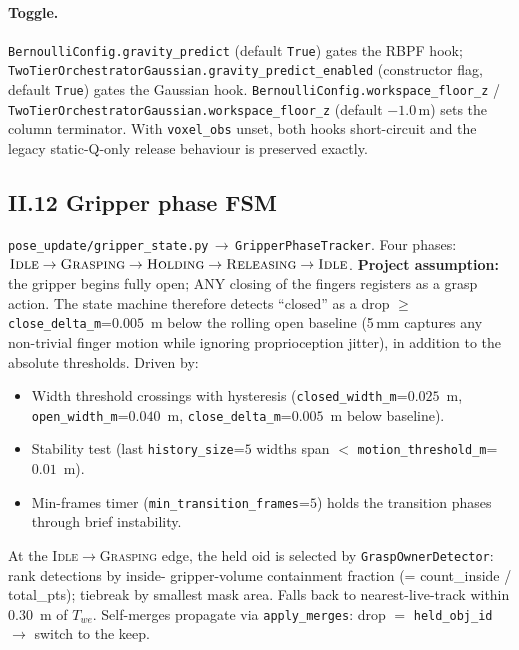 \documentclass[11pt]{article}
\newcommand{\file}[1]{\texttt{#1}}
\begin{document}
\paragraph{Toggle.}
\texttt{BernoulliConfig.gravity\_predict} (default \texttt{True})
gates the RBPF hook;
\texttt{TwoTierOrchestratorGaussian.gravity\_predict\_enabled}
(constructor flag, default \texttt{True}) gates the Gaussian hook.
\texttt{BernoulliConfig.workspace\_floor\_z} /
\texttt{TwoTierOrchestratorGaussian.workspace\_floor\_z} (default
$-1.0$\,m) sets the column terminator. With \texttt{voxel\_obs}
unset, both hooks short-circuit and the legacy static-Q-only release
behaviour is preserved exactly.

\subsection*{II.12 Gripper phase FSM}

\file{pose\_update/gripper\_state.py}\,$\to$\,\texttt{GripperPhaseTracker}.
Four phases:
$\textsc{Idle}\to\textsc{Grasping}\to\textsc{Holding}\to\textsc{Releasing}\to\textsc{Idle}$.
\textbf{Project assumption:} the gripper begins fully open; ANY closing
of the fingers registers as a grasp action. The state machine therefore
detects ``closed'' as a drop $\ge $ \texttt{close\_delta\_m}=$0.005$~m
below the rolling open baseline (5\,mm captures any non-trivial finger
motion while ignoring proprioception jitter), in addition to the
absolute thresholds. Driven by:
\begin{itemize}
\item Width threshold crossings with hysteresis
  (\texttt{closed\_width\_m}=$0.025$~m, \texttt{open\_width\_m}=$0.040$~m,
  \texttt{close\_delta\_m}=$0.005$~m below baseline).
\item Stability test (last \texttt{history\_size}=$5$ widths span
  $<$ \texttt{motion\_threshold\_m}=$0.01$~m).
\item Min-frames timer (\texttt{min\_transition\_frames}=$5$) holds the
  transition phases through brief instability.
\end{itemize}
At the \textsc{Idle}$\to$\textsc{Grasping} edge, the held oid is
selected by \texttt{GraspOwnerDetector}: rank detections by inside-
gripper-volume containment fraction (= count\_inside / total\_pts);
tiebreak by smallest mask area. Falls back to nearest-live-track
within $0.30$~m of $T_{we}$. Self-merges propagate via
\texttt{apply\_merges}: drop $=$ \texttt{held\_obj\_id} $\to$ switch
to the keep.
\end{document}
